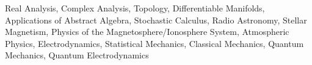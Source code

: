 Real Analysis, Complex Analysis, Topology, Differentiable Manifolds,
Applications of Abstract Algebra, Stochastic Calculus, 
Radio Astronomy, Stellar Magnetism, Physics of the Magnetosphere/Ionosphere System,
Atmospheric Physics, Electrodynamics, Statistical Mechanics,
Classical Mechanics, Quantum Mechanics, Quantum Electrodynamics
